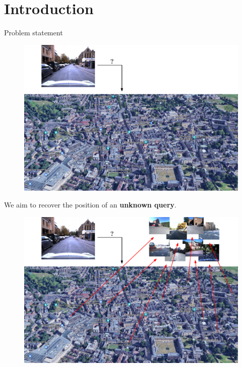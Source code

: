 \section{Introduction}

\label{sec:intro}

\begin{frame}{Problem statement}
	\only<1>
	{
	\begin{minipage}{0.75\linewidth}
		\begin{figure}
			\includegraphics[width=\linewidth]{vect/intro/fig1/1}
		\end{figure}		
	\end{minipage}
	\hfill
	\begin{minipage}{0.18\linewidth}
		We aim to recover the position of an \textbf{unknown query}.	
	\end{minipage}
	}
	{
	\begin{minipage}{0.75\linewidth}
		\begin{figure}
			\includegraphics[width=\linewidth]{vect/intro/fig1/2}

\end{figure}
\end{minipage}}
\end{frame}
